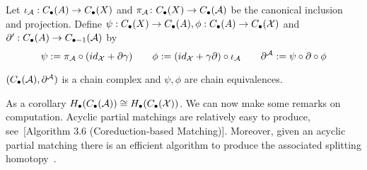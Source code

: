   Let $\iota_{\mathcal A}:C_\bullet(A)\to C_\bullet(X)$ and $\pi_{\mathcal A}\colon C_\bullet(X)\to C_\bullet({\mathcal A})$ be the canonical inclusion and projection.  Define $\psi:C_\bullet(X)\to C_\bullet(A), \phi:C_\bullet(A)\to C_\bullet({\mathcal X})$ and $\partial':C_\bullet(A)\to C_{\bullet-1}({\mathcal A})$ by $$\psi:=\pi_{\mathcal A}\circ (id_{\mathcal X}+\partial \gamma) \quad\quad  \phi:= (id_{\mathcal X}+\gamma \partial)\circ \iota_{\mathcal A} \quad\quad \partial^{\mathcal A}:= \psi\circ \partial\circ \phi $$
 
  
 \begin{thm}
 $(C_\bullet({\mathcal A}),\partial^{\mathcal A})$ is a chain complex and $\psi,\phi$ are chain equivalences.  
 \end{thm}
 
 As a corollary $H_\bullet(C_\bullet({\mathcal A}))\cong H_\bullet(C_\bullet({\mathcal X}))$.  We can now make some remarks on computation.  Acyclic partial matchings are relatively easy to produce, see~[Algorithm 3.6 (Coreduction-based Matching)]\cite{focm}.   Moreover, given an acyclic partial matching there is an efficient algorithm to produce the associated splitting homotopy~\cite[Algorithm 3.12 (Gamma Algorithm)]{focm}.  
 
 
 
 
%
%
% 
%
%
%
%




